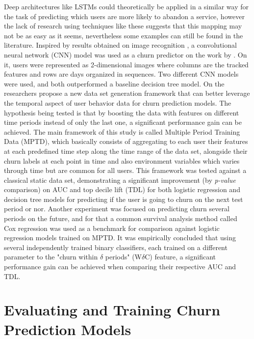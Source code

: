 \documentclass{kththesis}
\begin{document}
Deep architectures like LSTMs could theoretically be applied in a similar way for the task of predicting which users are more likely to abandon a service, however the lack of research using techniques like these suggests that this mapping may not be as easy as it seems, nevertheless some examples can still be found in the literature. Inspired by results obtained on image recognition \citep{krizhevsky2012imagenet}, a convolutional neural network (CNN) model was used as a churn predictor on the work by \citep{Wangperawong2016}. On it, users were represented as 2-dimensional images where columns are the tracked features and rows are days organized in sequences. Two different CNN models were used, and both outperformed a baseline decision tree model. On \citep{GurAli2014} the researchers propose a new data set generation framework that can better leverage the temporal aspect of user behavior data for churn prediction models. The hypothesis being tested is that by boosting the data with features on different time periods instead of only the last one, a significant performance gain can be achieved. The main framework of this study is called Multiple Period Training Data (MPTD), which basically consists of aggregating to each user their features at each predefined time step along the time range of the data set, alongside their churn labels at each point in time and also environment variables which varies through time but are common for all users. This framework was tested against a classical static data set, demonstrating a significant improvement (by \emph{p-value} comparison) on AUC and top decile lift (TDL) for both logistic regression and decision tree models for predicting if the user is going to churn on the next test period or nor. Another experiment was focused on predicting churn several periods on the future, and for that a common survival analysis method called Cox regression was used as a benchmark for comparison against logistic regression models trained on MPTD. It was empirically concluded that using several independently trained binary classifiers, each trained on a different parameter to the "churn within $\delta$ periods" (W$\delta$C) feature, a significant performance gain can be achieved when comparing their respective AUC and TDL.


\section{Evaluating and Training Churn Prediction Models}
\end{document}

